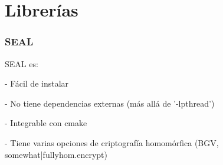 \chapter{Librerías}

\subsection{SEAL}

SEAL es:

- Fácil de instalar

- No tiene dependencias externas (más allá de '-lpthread')

- Integrable con cmake

- Tiene varias opciones de criptografía homomórfica (BGV, {somewhat|fully}hom.encrypt)